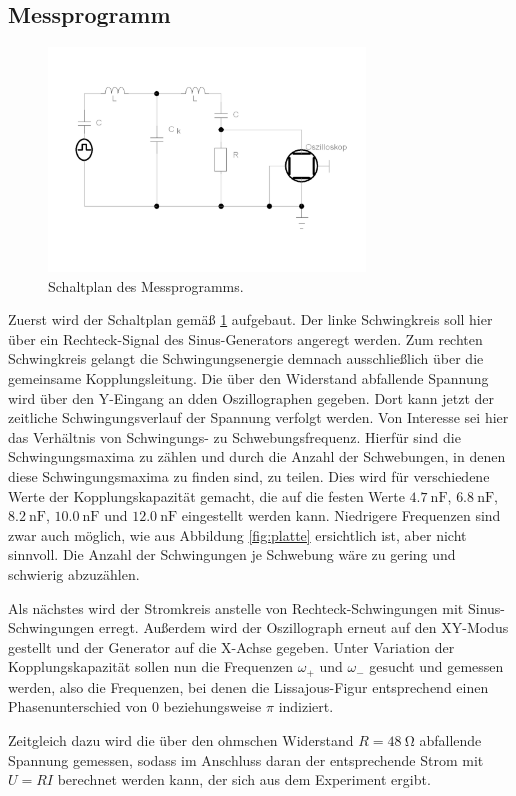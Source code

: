 \subsection{Messprogramm}
\begin{figure}
    \centering
    \includegraphics[width=0.75\textwidth]{plots/gekop_schw_kreis3.pdf}
    \caption{Schaltplan des Messprogramms.}
    \label{fig:messung_schweb}
\end{figure}
Zuerst wird der Schaltplan gemäß \ref{fig:messung_schweb} aufgebaut. 
Der linke Schwingkreis soll hier über ein Rechteck-Signal des Sinus-Generators angeregt werden. 
Zum rechten Schwingkreis gelangt die Schwingungsenergie demnach ausschließlich über die gemeinsame Kopplungsleitung. 
Die über den Widerstand abfallende Spannung wird über den Y-Eingang an dden Oszillographen gegeben. 
Dort kann jetzt der zeitliche Schwingungsverlauf der Spannung verfolgt werden. 
Von Interesse sei hier das Verhältnis von Schwingungs- zu Schwebungsfrequenz. 
Hierfür sind die Schwingungsmaxima zu zählen und durch die Anzahl der Schwebungen, in denen diese Schwingungsmaxima zu finden 
sind, zu teilen. 
Dies wird für verschiedene Werte der Kopplungskapazität gemacht, die auf die festen Werte $\SI{4.7}{\nano\farad}$, 
$\SI{6.8}{\nano\farad}$, $\SI{8.2}{\nano\farad}$, $\SI{10.0}{\nano\farad}$ und $\SI{12.0}{\nano\farad}$ eingestellt werden kann.
Niedrigere Frequenzen sind zwar auch möglich, wie aus Abbildung \ref{fig:platte} ersichtlich ist, aber nicht sinnvoll. 
Die Anzahl der Schwingungen je Schwebung wäre zu gering und schwierig abzuzählen. 

Als nächstes wird der Stromkreis anstelle von Rechteck-Schwingungen mit Sinus-Schwingungen erregt. 
Außerdem wird der Oszillograph erneut auf den XY-Modus gestellt und der Generator auf die X-Achse gegeben. 
Unter Variation der Kopplungskapazität sollen nun die Frequenzen $\omega _+$ und $\omega _-$ gesucht und gemessen werden, 
also die Frequenzen, bei denen die Lissajous-Figur entsprechend einen Phasenunterschied von $0$ beziehungsweise $\pi$ indiziert. 

Zeitgleich dazu wird die über den ohmschen Widerstand $R=\SI{48}{\ohm}$ abfallende Spannung gemessen, sodass im Anschluss 
daran der entsprechende Strom mit $U=RI$ berechnet werden kann, der sich aus dem Experiment ergibt. 